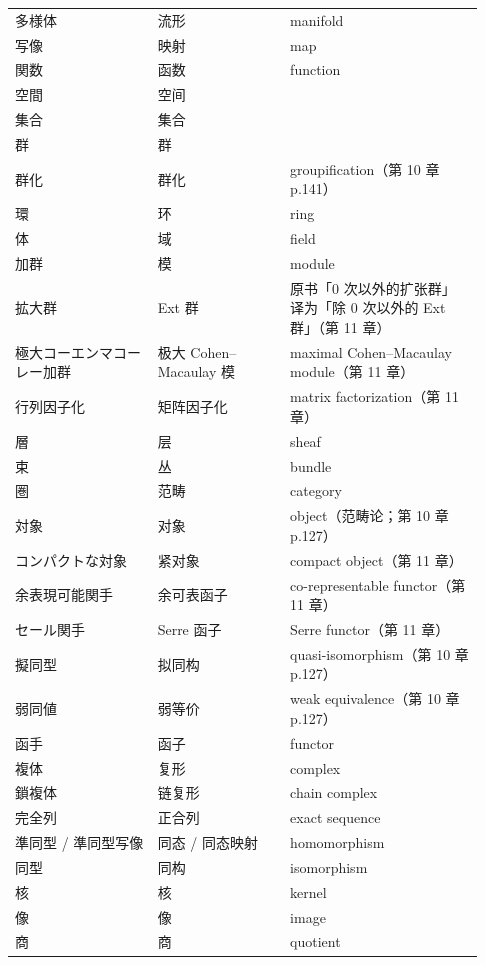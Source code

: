 \begin{longtable}{@{}>{\raggedright\arraybackslash}p{0.29\linewidth}>{\raggedright\arraybackslash}p{0.26\linewidth}>{\raggedright\arraybackslash}p{0.38\linewidth}@{}}
\midrule
多様体 & \mbox{流形} & manifold \\
写像 & \mbox{映射} & map \\
関数 & \mbox{函数} & function \\
空間 & \mbox{空间} &  \\
集合 & \mbox{集合} &  \\
群 & \mbox{群} &  \\
群化 & \mbox{群化} & groupification（第 10 章 p.141） \\
環 & \mbox{环} & ring \\
体 & \mbox{域} & field \\
加群 & \mbox{模} & module \\
拡大群 & Ext \mbox{群} & 原书「0 次以外的扩张群」译为「除 0 次以外的 Ext 群」（第 11 章） \\
極大コーエン\textendash{}マコーレー加群 & \mbox{极大} Cohen--Macaulay \mbox{模} & maximal Cohen--Macaulay module（第 11 章） \\
行列因子化 & \mbox{矩阵因子化} & matrix factorization（第 11 章） \\
層 & \mbox{层} & sheaf \\
束 & \mbox{丛} & bundle \\
圏 & \mbox{范畴} & category \\
対象 & \mbox{对象} & object（范畴论；第 10 章 p.127） \\
コンパクトな対象 & \mbox{紧对象} & compact object（第 11 章） \\
余表現可能関手 & \mbox{余可表函子} & co-representable functor（第 11 章） \\
セール関手 & Serre \mbox{函子} & Serre functor（第 11 章） \\
擬同型 & \mbox{拟同构} & quasi-isomorphism（第 10 章 p.127） \\
弱同値 & \mbox{弱等价} & weak equivalence（第 10 章 p.127） \\
函手 & \mbox{函子} & functor \\
複体 & \mbox{复形} & complex \\
鎖複体 & \mbox{链复形} & chain complex \\
完全列 & \mbox{正合列} & exact sequence \\
準同型 / 準同型写像 & \mbox{同态} / \mbox{同态映射} & homomorphism \\
同型 & \mbox{同构} & isomorphism \\
核 & \mbox{核} & kernel \\
像 & \mbox{像} & image \\
商 & \mbox{商} & quotient \\

\end{longtable}
